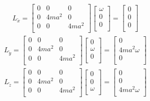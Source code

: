\documentclass{article}
\begin{document}
\begin{enumerate}[(a)]
\begin{gather*}
L_{\tilde{x}}=
\begin{bmatrix}
	    0   & 	  0	  &     0	\\
		0	&  4ma^2  &     0   \\
	    0   & 	  0	  &  4ma^2	\\
\end{bmatrix}
\begin{bmatrix}
	\omega\\
	0\\
	0\\
\end{bmatrix}
=
\begin{bmatrix}
	0\\
	0\\
	0\\
\end{bmatrix}
\end{gather*}
\begin{gather*}
L_{\tilde{y}}=
\begin{bmatrix}
	    0   & 	  0	  &     0	\\
		0	&  4ma^2  &     0   \\
	    0   & 	  0	  &  4ma^2	\\
\end{bmatrix}
\begin{bmatrix}
	0\\
	\omega\\
	0\\
\end{bmatrix}
=
\begin{bmatrix}
	0\\
	4ma^2\omega\\
	0\\
\end{bmatrix}
\end{gather*}
\begin{gather*}
L_{\tilde{z}}=
\begin{bmatrix}
	    0   & 	  0	  &     0	\\
		0	&  4ma^2  &     0   \\
	    0   & 	  0	  &  4ma^2	\\
\end{bmatrix}
\begin{bmatrix}
	0\\
	0\\
	\omega\\
\end{bmatrix}
=
\begin{bmatrix}
	0\\
	0\\
	4ma^2\omega\\
\end{bmatrix}
\end{gather*}


\end{enumerate}
\end{document}
